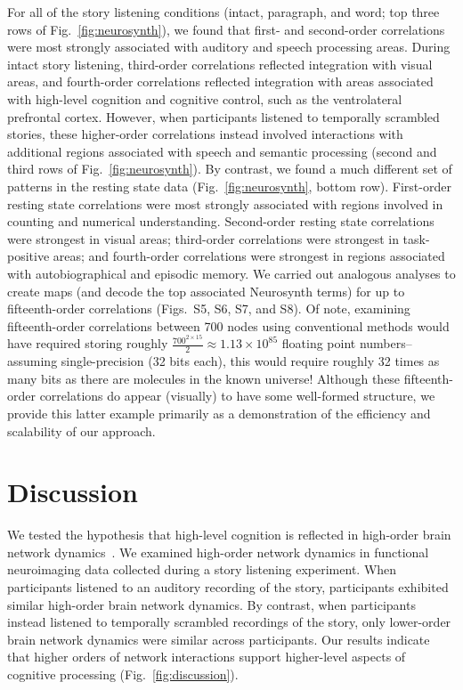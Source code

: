 \documentclass[english]{article}
\newcommand{\intact}{S5}
\newcommand{\para}{S6}
\newcommand{\word}{S7}
\newcommand{\rest}{S8}
\begin{document}
For all of the story listening conditions (intact, paragraph, and
word; top three rows of Fig.~\ref{fig:neurosynth}), we found that
first- and second-order correlations were most strongly associated
with auditory and speech processing areas.  During intact story
listening, third-order correlations reflected integration with visual
areas, and fourth-order correlations reflected integration with areas
associated with high-level cognition and cognitive control, such as
the ventrolateral prefrontal cortex.  However, when participants
listened to temporally scrambled stories, these higher-order
correlations instead involved interactions with additional regions
associated with speech and semantic processing (second and third rows
of Fig.~\ref{fig:neurosynth}).  By contrast, we found
a much different set of patterns in the resting state data
(Fig.~\ref{fig:neurosynth}, bottom row).
First-order resting state correlations were most strongly associated
with regions involved in counting and numerical understanding.
Second-order resting state correlations were strongest in visual
areas; third-order correlations were strongest in task-positive areas;
and fourth-order correlations were strongest in regions associated
with autobiographical and episodic memory.  We carried out analogous
analyses to create maps (and decode the top associated Neurosynth
terms) for up to fifteenth-order correlations (Figs.~\intact, \para,
\word, and \rest).  Of note, examining fifteenth-order correlations
between 700 nodes using conventional methods would have required
storing roughly
$\frac{700^{2 \times 15}}{2} \approx 1.13 \times 10^{85}$ floating
point numbers-- assuming single-precision (32 bits each), this would
require roughly 32 times as many bits as there are molecules in the
known universe!  Although these fifteenth-order correlations do appear
(visually) to have some well-formed structure, we provide this latter
example primarily as a demonstration of the efficiency and scalability
of our approach.






\section*{Discussion}
We tested the hypothesis that high-level cognition is reflected in
high-order brain network dynamics~\cite{SoloEtal19,
  ReimEtal17}.  We examined high-order network dynamics in functional
neuroimaging data collected during a story listening experiment.  When
participants listened to an auditory recording of the story,
participants exhibited similar high-order brain network dynamics.  By
contrast, when participants instead listened to temporally scrambled
recordings of the story, only lower-order brain network dynamics were
similar across participants.  Our results indicate that higher orders
of network interactions support higher-level aspects of cognitive
processing (Fig.~\ref{fig:discussion}).
\end{document}
